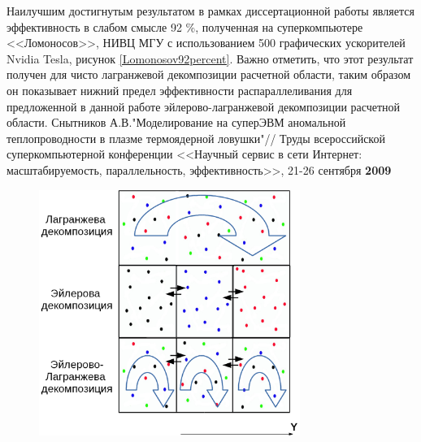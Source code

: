 Наилучшим достигнутым результатом в рамках диссертационной работы является эффективность в слабом смысле 92 \%, полученная на суперкомпьютере <<Ломоносов>>, НИВЦ МГУ с использованием 500 графических ускорителей Nvidia Tesla, рисунок  \ref{Lomonosov92percent}.
Важно отметить, что этот результат получен для чисто лагранжевой декомпозиции расчетной области, таким образом он показывает нижний предел эффективности распараллеливания для предложенной в данной работе эйлерово-лагранжевой декомпозиции расчетной области.
{\small Снытников А.В."Моделирование на суперЭВМ аномальной  теплопроводности в плазме термоядерной ловушки"// Труды всероссийской суперкомпьютерной конференции <<Научный сервис в сети Интернет: масштабируемость, параллельность, эффективность>>, 21-26 сентября \textbf{2009}}


\begin{figure}[]
\begin{center}
\includegraphics[height=8cm,keepaspectratio]{images/decomp_all.png}
\end{center}
\end{figure}

\clearpage

